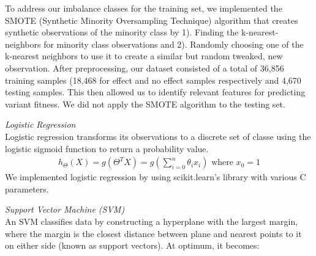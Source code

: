 \documentclass[journal]{IEEEtran}
\begin{document}
To address our imbalance classes for the training set, we implemented the SMOTE (Synthetic Minority Oversampling Technique) algorithm that creates synthetic observations of the minority class by 1). Finding the k-nearest-neighbors for minority class observations and 2). Randomly choosing one of the k-nearest neighbors to use it to create a similar but random tweaked, new observation. After preprocessing, our dataset consisted of a total of 36,856 training samples (18,468 for effect and no effect samples respectively and 4,670 testing samples. This then allowed us to identify relevant features for predicting variant fitness. We did not apply the SMOTE algorithm to the testing set. 

\textit{Logistic Regression \\ }
 Logistic regression transforms its observations to a discrete set of classe using the logistic sigmoid function to return a probability value.
\begin{align}
h_{\Theta}(X) = g(\Theta^{T} X) = g(\sum_{i=0}^{n} \theta_{i} x_{i}) \text{ where } x_0 = 1
\end{align}
 We implemented logistic regression  by using scikit.learn’s library with various C parameters. 
 
\textit{Support Vector Machine (SVM)\\}
An SVM classifies data by constructing a hyperplane with the largest margin, where the margin is the closest distance between plane and nearest points to it on either side (known as support vectors). At optimum, it becomes: 
\end{document}
